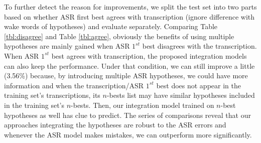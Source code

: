 \begin{table}[h]
	\centering
	\vspace{-1ex}
	\label{tbl:agree}

\end{table}

To further detect the reason for improvements, we split the test set into two parts based on whether ASR first best agrees with transcription (ignore difference with wake words of hypotheses) and evaluate separately. Comparing Table \ref{tbl:disagree} and Table \ref{tbl:agree}, obviously the benefits of using multiple hypotheses are mainly gained when  ASR $1^{st}$ best disagrees with the transcription. When ASR $1^{st}$ best agrees with transcription, the proposed integration models can also keep the performance. Under that condition, we can still improve a little (3.56\%) because, by introducing multiple ASR hypotheses, we could have more information and when the transcription/ASR $1^{st}$ best does not appear in the training set's transcriptions, its $n$-bests list may have similar hypotheses included in the training set's $n$-bests. Then, our integration model trained on $n$-best hypotheses as well has clue to predict. 
The series of comparisons reveal that our approaches integrating the hypotheses are robust to the ASR errors and whenever the ASR model makes mistakes, we can outperform more significantly. 


